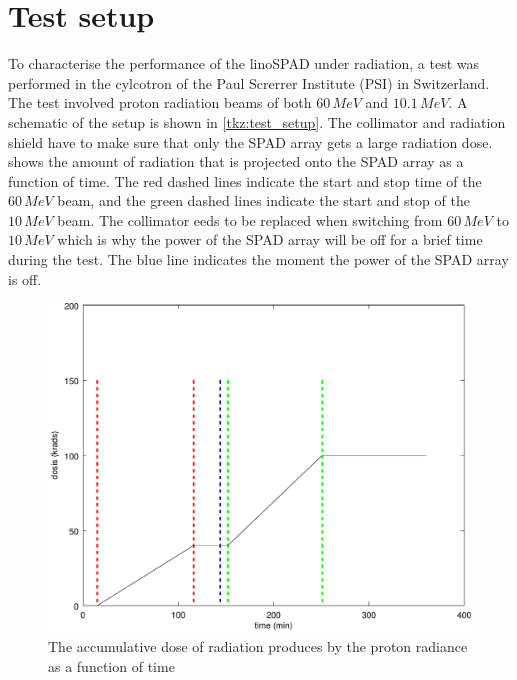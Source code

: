 \section{Test setup}\label{ssec:test_setup}
To characterise the performance of the linoSPAD under radiation, a test was performed in the cylcotron of the Paul Screrrer Institute (PSI) in Switzerland. The test involved proton radiation beams of both $60\,MeV$ and $10.1\,MeV$. A schematic of the setup is shown in \cref{tkz:test_setup}. The collimator and radiation shield have to make sure that only the SPAD array gets a large radiation dose.  shows the amount of radiation that is projected onto the SPAD array as a function of time. The red dashed lines indicate the start and stop time of the $60\,MeV$ beam, and the green dashed lines indicate the start and stop of the $10\,MeV$ beam. The collimator eeds to be replaced when switching from $60\,MeV$ to $10\,MeV$ which is why the power of the SPAD array will be off for a brief time during the test. The blue line indicates the moment the power of the SPAD array is off.






\begin{figure}[h]
\centering
	\includegraphics[width=0.6\linewidth]{fig/dosis.pdf}
\caption{The accumulative dose of radiation produces by the proton radiance as a function of time}
\label{fig:dosis}
\end{figure}



